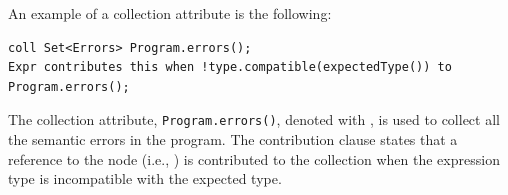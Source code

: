     An example of a collection attribute is the following:
    \begin{lstlisting}[language=JastAdd]
coll Set<Errors> Program.errors();
Expr contributes this when !type.compatible(expectedType()) to Program.errors();
    \end{lstlisting}
    The collection attribute, \texttt{Program.errors()}, denoted with ,
    is used to collect all the semantic errors in the program. The contribution clause
    states that a reference to the  node (i.e., ) is contributed to the collection when
    the expression type is incompatible with the expected type.





